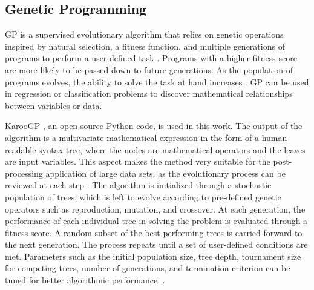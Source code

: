 \subsection*{Genetic Programming}

\ac{GP} is a supervised evolutionary algorithm \cite{koza_genetic} that relies on genetic operations inspired by natural selection, a fitness function, and multiple generations of
programs to perform a user-defined task \cite{GP_book}. Programs with a higher fitness score are more likely to be passed down to future generations. As the population of programs evolves,
the ability to solve the task at hand increases \cite{Kai_thesis}. \ac{GP} can be used in regression or classification problems to discover mathematical relationships between
variables or data. 

KarooGP \cite{KarooGP,KarooPYPI}, an open-source Python code, is used in this work. The output of the algorithm is a multivariate mathematical expression in the form of a human-readable
syntax tree, where the nodes are mathematical operators and the leaves are input variables. This aspect makes the method very suitable for the post-processing application of large data
sets, as the evolutionary process can be reviewed at each step \cite{Cavaglia_2020}. The algorithm is initialized through a stochastic population of trees, which is left to evolve according
to pre-defined genetic operators such as reproduction, mutation, and crossover. At each generation, the performance of each individual tree in solving the problem is evaluated through a
fitness score. A random subset of the best-performing trees is carried forward to the next generation. The process repeats until a set of user-defined conditions are met. Parameters such as
the initial population size, tree depth, tournament size for competing trees, number of generations, and termination criterion can be tuned for better algorithmic performance.
.
